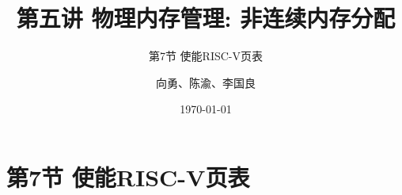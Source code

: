 


\title[第5讲]{第五讲 物理内存管理: 非连续内存分配} %
\subtitle{第7节 使能RISC-V页表}
\author{向勇、陈渝、李国良} %
\date{\today} %



\begin{frame}
\titlepage %
\end{frame}


\section{第7节 使能RISC-V页表}%




